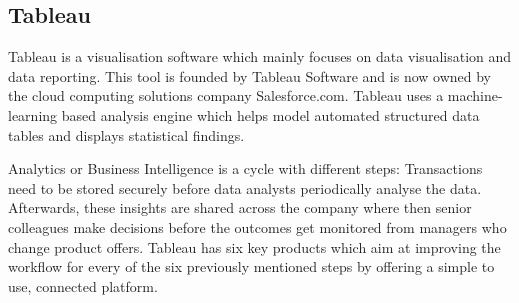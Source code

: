 \documentclass[../paper.tex]{subfiles}
\begin{document}
\subsection{Tableau}

Tableau is a visualisation software which mainly focuses on data visualisation
and data reporting. This tool is founded by Tableau Software and is now owned
by the cloud computing solutions company Salesforce.com. Tableau uses a
machine-learning based analysis engine which helps model automated structured
data tables and displays statistical findings.

Analytics or Business Intelligence is a cycle with different steps:
Transactions need to be stored securely before data analysts periodically
analyse the data. Afterwards, these insights are shared across the company
where then senior colleagues make decisions before the outcomes get monitored
from managers who change product offers. Tableau has six key products which
aim at improving the workflow for every of the six previously mentioned steps
by offering a simple to use, connected platform.
\end{document}
